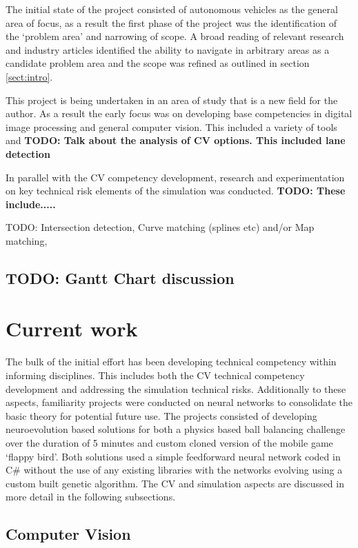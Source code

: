 \documentclass[]{aiaa-tc}%
\begin{document}
The initial state of the project consisted of autonomous vehicles as the general area of focus, as a result the first phase of the project was the identification of the `problem area' and narrowing of scope. A broad reading of relevant research and industry articles identified the ability to navigate in arbitrary areas as a candidate problem area and the scope was refined as outlined in section \ref{sect:intro}. 

This project is being undertaken in an area of study that is a new field for the author. As a result the early focus was on developing base competencies in digital image processing and general computer vision. This included a variety of tools and \textbf{TODO: Talk about the analysis of CV options. This included lane detection}

In parallel with the CV competency development, research and experimentation on key technical risk elements of the simulation was conducted. \textbf{TODO: These include.....}

TODO:  Intersection detection, Curve matching (splines etc) and/or Map matching, 

\subsection{TODO: Gantt Chart discussion}

\section{Current work}

The bulk of the initial effort has been developing technical competency within informing disciplines. This includes both the CV technical competency development and addressing the simulation technical risks. Additionally to these aspects, familiarity projects were conducted on neural networks to consolidate the basic theory for potential future use. The projects consisted of developing neuroevolution based solutions for both a physics based ball balancing challenge over the duration of 5 minutes and custom cloned version of the mobile game `flappy bird'. Both solutions used a simple feedforward neural network coded in C\# without the use of any existing libraries with the networks evolving using a custom built genetic algorithm. The CV and simulation aspects are discussed in more detail in the following subsections.

\subsection{Computer Vision}
\end{document}
